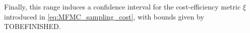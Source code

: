 Finally, this range induces a confidence interval for the cost-efficiency metric $\xi$ introduced in \eqref{eq:MFMC_sampling_cost}, with bounds given by TOBEFINISHED.

